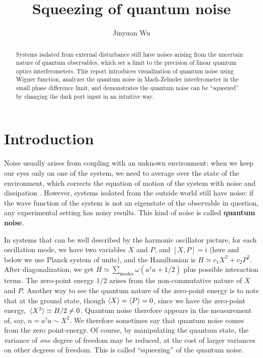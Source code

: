 \documentclass[hyperref, a4paper]{article}
\title{Squeezing of quantum noise}
\author{Jinyuan Wu}
\newcommand*{\ii}{\mathrm{i}}
\newcommand*{\concept}[1]{{\textbf{#1}}}
\begin{document}
    
\maketitle

\begin{abstract}
    Systems isolated from external disturbance still have noises 
    arising from the uncertain nature of quantum observables,
    which set a limit to the precision of linear quantum optics interferometers.
    This report introduces visualization of quantum noise using Wigner function,
    analyzes the quantum noise in Mach-Zehnder interferometer 
    in the small phase difference limit,
    and demonstrates the quantum noise can be ``squeezed''
    by changing the dark port input
    in an intuitive way.
\end{abstract}

\section{Introduction}

Noise usually arises from coupling with an unknown environment:
when we keep our eyes only on one of the system,
we need to average over the state of the environment,
which corrects the equation of motion of the system 
with noise and dissipation \cite{zwanzig_nonequilibrium_2001}.
However, systems isolated from the outside world still have noise:
if the wave function of the system is not an eigenstate of the observable in question, 
any experimental setting has noisy results.
This kind of noise is called \concept{quantum noise}.

In systems that can be well described by 
the harmonic oscillator picture,
for each oscillation mode, 
we have two variables $X$ and $P$, and $[X, P] = \ii$
(here and below we use Planck system of units),
and the Hamiltonian is $H \simeq c_1 X^2 + c_2 P^2$.
After diagonalization, we get $H \simeq \sum_{\text{modes}} \omega (a^\dagger a + 1/2)$ 
plus possible interaction terms.
The zero-point energy $1/2$ arises from the non-commutative nature of $X$ and $P$.
Another way to see the quantum nature of the zero-point energy is to note that at the ground state,
though $\expval{X} = \expval{P} = 0$,
since we have the zero-point energy,
$\expval*{X^2} \simeq H / 2 \neq 0$.
Quantum noise therefore appears in the measurement of, say, 
$n = a^\dagger a \sim X^2$.
We therefore sometimes say that 
quantum noise comes from the zero point-energy.
Of course, by manipulating the quantum state, 
the variance of \emph{one} degree of freedom 
may be reduced,
at the cost of larger variances on other degrees of freedom.
This is called ``squeezing'' of the quantum noise.
\end{document}
